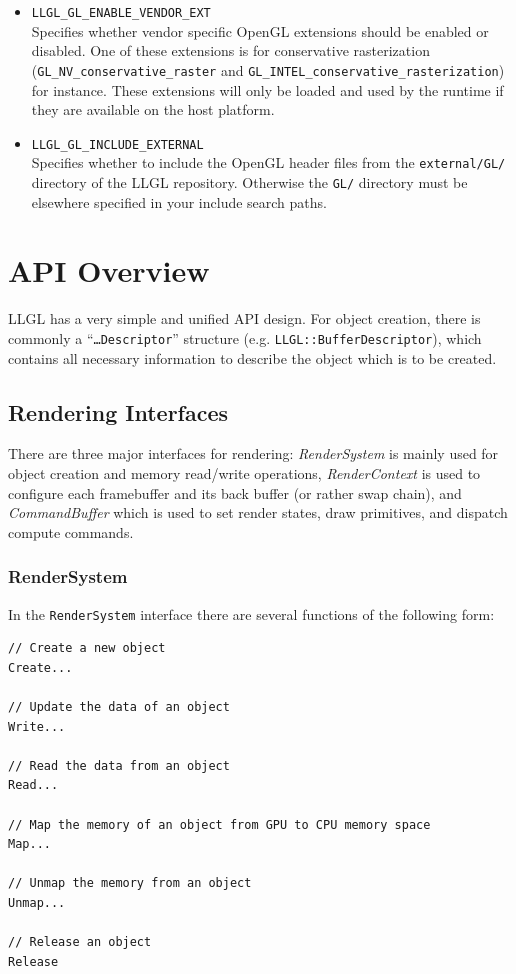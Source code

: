 \documentclass{article}
\begin{document}
\begin{itemize}
	\item \texttt{LLGL\_GL\_ENABLE\_VENDOR\_EXT} \\
	Specifies whether vendor specific OpenGL extensions should be enabled or disabled.
	One of these extensions is for conservative rasterization
	(\texttt{GL\_NV\_conservative\_raster} and \texttt{GL\_INTEL\_conservative\_rasterization}) for instance.
	These extensions will only be loaded and used by the runtime if they are available on the host platform.
	
	\item \texttt{LLGL\_GL\_INCLUDE\_EXTERNAL} \\
	Specifies whether to include the OpenGL header files from the \texttt{external/GL/} directory of the LLGL repository.
	Otherwise the \texttt{GL/} directory must be elsewhere specified in your include search paths.
\end{itemize}



\clearpage
\newpage
\section{API Overview}

LLGL has a very simple and unified API design.
For object creation, there is commonly a ``\texttt{\dots Descriptor}'' structure (e.g. \texttt{LLGL::BufferDescriptor}),
which contains all necessary information to describe the object which is to be created.

\subsection{Rendering Interfaces}

There are three major interfaces for rendering:
\emph{RenderSystem} is mainly used for object creation and memory read/write operations,
\emph{RenderContext} is used to configure each framebuffer and its back buffer (or rather swap chain),
and \emph{CommandBuffer} which is used to set render states, draw primitives, and dispatch compute commands.

\subsubsection{RenderSystem}

In the \texttt{RenderSystem} interface there are several functions of the following form:
\begin{lstlisting}
// Create a new object
Create...

// Update the data of an object
Write...

// Read the data from an object
Read...

// Map the memory of an object from GPU to CPU memory space
Map...

// Unmap the memory from an object
Unmap...

// Release an object
Release
\end{lstlisting}
\end{document}
